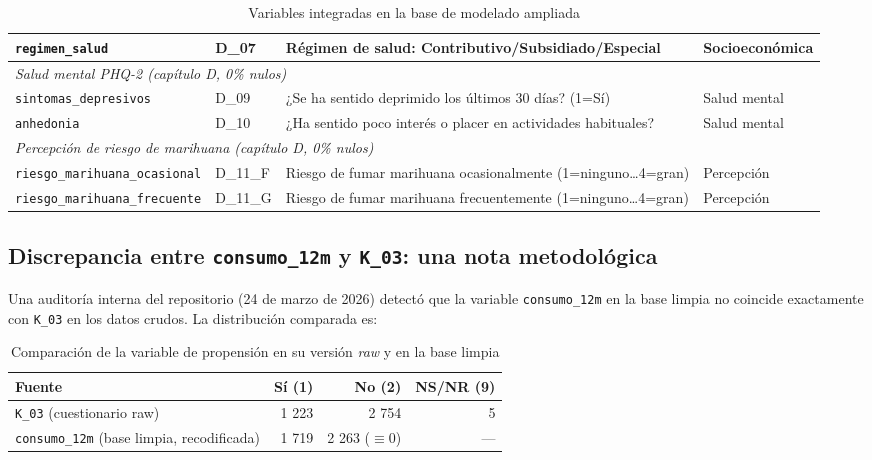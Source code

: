 \documentclass[12pt, a4paper]{article}
\begin{document}
\begin{table}[H]
\begin{tabular}{p{2.9cm} p{1.5cm} p{5.8cm} p{3.2cm}}
\texttt{regimen\_salud} & D\_07 & Régimen de salud: Contributivo/Subsidiado/Especial & Socioeconómica \\
\midrule
\multicolumn{4}{l}{\textit{Salud mental PHQ-2 (capítulo D, 0\% nulos)}} \\
\texttt{sintomas\_depresivos} & D\_09 & ¿Se ha sentido deprimido los últimos 30 días? (1=Sí) & Salud mental \\
\texttt{anhedonia} & D\_10 & ¿Ha sentido poco interés o placer en actividades habituales? & Salud mental \\
\midrule
\multicolumn{4}{l}{\textit{Percepción de riesgo de marihuana (capítulo D, 0\% nulos)}} \\
\texttt{riesgo\_marihuana\_ocasional} & D\_11\_F & Riesgo de fumar marihuana ocasionalmente (1=ninguno\ldots 4=gran) & Percepción \\
\texttt{riesgo\_marihuana\_frecuente} & D\_11\_G & Riesgo de fumar marihuana frecuentemente (1=ninguno\ldots 4=gran) & Percepción \\
\bottomrule
\end{tabular}
\caption{Variables integradas en la base de modelado ampliada}
\label{tab:variables}
\end{table}

\subsection{Discrepancia entre \texttt{consumo\_12m} y \texttt{K\_03}: una nota metodológica}\label{sec:discrepancia}

Una auditoría interna del repositorio (24 de marzo de 2026) detectó que la variable \texttt{consumo\_12m} en la base limpia no coincide exactamente con \texttt{K\_03} en los datos crudos. La distribución comparada es:

\begin{table}[H]
\centering
\small
\begin{tabular}{lrrr}
\toprule
Fuente & Sí (1) & No (2) & NS/NR (9) \\
\midrule
\texttt{K\_03} (cuestionario raw) & 1 223 & 2 754 & 5 \\
\texttt{consumo\_12m} (base limpia, recodificada) & 1 719 & 2 263 ($\equiv 0$) & --- \\
\bottomrule
\end{tabular}
\caption{Comparación de la variable de propensión en su versión \textit{raw} y en la base limpia}
\label{tab:discrepancia}
\end{table}
\end{document}
